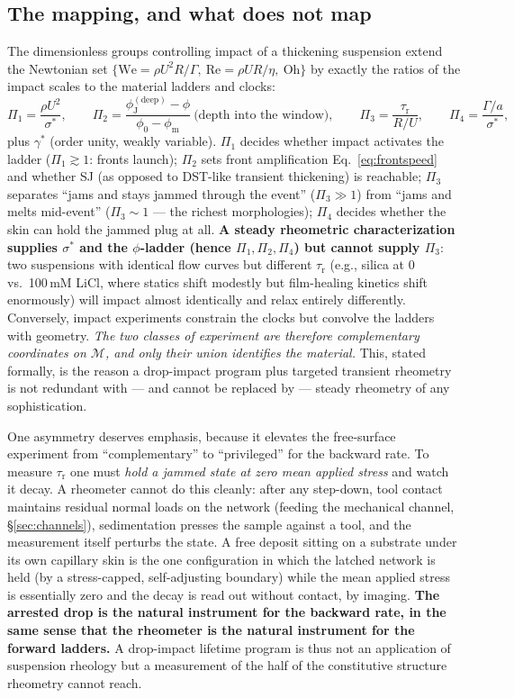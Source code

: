 \documentclass[11pt]{article}
\newcommand{\phiJ}{\phi_{\mathrm{J}}}
\newcommand{\phiO}{\phi_{0}}
\newcommand{\phiM}{\phi_{\mathrm{m}}}
\newcommand{\sigmastar}{\sigma^{*}}
\begin{document}
\subsection{The mapping, and what does not map}
\label{sec:mapping}
The dimensionless groups controlling impact of a thickening suspension extend the Newtonian set $\{\mathrm{We} = \rho U^2 R/\Gamma,\ \mathrm{Re} = \rho U R/\eta,\ \mathrm{Oh}\}$ by exactly the ratios of the impact scales to the material ladders and clocks:
\begin{equation}
\Pi_1 = \frac{\rho U^{2}}{\sigmastar}, \qquad
\Pi_2 = \frac{\phiJ^{(\mathrm{deep})}\!-\phi}{\phiO - \phiM}\ \text{(depth into the window)}, \qquad
\Pi_3 = \frac{\tau_{\mathrm{r}}}{R/U}, \qquad
\Pi_4 = \frac{\Gamma/a}{\sigmastar},
\label{eq:groups}
\end{equation}
plus $\gamma^{*}$ (order unity, weakly variable). $\Pi_1$ decides whether impact activates the ladder ($\Pi_1 \gtrsim 1$: fronts launch); $\Pi_2$ sets front amplification Eq.~\eqref{eq:frontspeed} and whether SJ (as opposed to DST-like transient thickening) is reachable; $\Pi_3$ separates ``jams and stays jammed through the event'' ($\Pi_3 \gg 1$) from ``jams and melts mid-event'' ($\Pi_3 \sim 1$ --- the richest morphologies); $\Pi_4$ decides whether the skin can hold the jammed plug at all. \textbf{A steady rheometric characterization supplies $\sigmastar$ and the $\phi$-ladder (hence $\Pi_1, \Pi_2, \Pi_4$) but cannot supply $\Pi_3$}: two suspensions with identical flow curves but different $\tau_{\mathrm{r}}$ (e.g., silica at 0 vs.\ 100\,mM LiCl, where statics shift modestly but film-healing kinetics shift enormously) will impact almost identically and relax entirely differently. Conversely, impact experiments constrain the clocks but convolve the ladders with geometry. \emph{The two classes of experiment are therefore complementary coordinates on $\mathcal{M}$, and only their union identifies the material.} This, stated formally, is the reason a drop-impact program plus targeted transient rheometry is not redundant with — and cannot be replaced by — steady rheometry of any sophistication.

One asymmetry deserves emphasis, because it elevates the free-surface experiment from ``complementary'' to ``privileged'' for the backward rate. To measure $\tau_{\mathrm{r}}$ one must \emph{hold a jammed state at zero mean applied stress} and watch it decay. A rheometer cannot do this cleanly: after any step-down, tool contact maintains residual normal loads on the network (feeding the mechanical channel, \S\ref{sec:channels}), sedimentation presses the sample against a tool, and the measurement itself perturbs the state. A free deposit sitting on a substrate under its own capillary skin is the one configuration in which the latched network is held (by a stress-capped, self-adjusting boundary) while the mean applied stress is essentially zero and the decay is read out without contact, by imaging. \textbf{The arrested drop is the natural instrument for the backward rate, in the same sense that the rheometer is the natural instrument for the forward ladders.} A drop-impact lifetime program is thus not an application of suspension rheology but a measurement of the half of the constitutive structure rheometry cannot reach.
\end{document}

